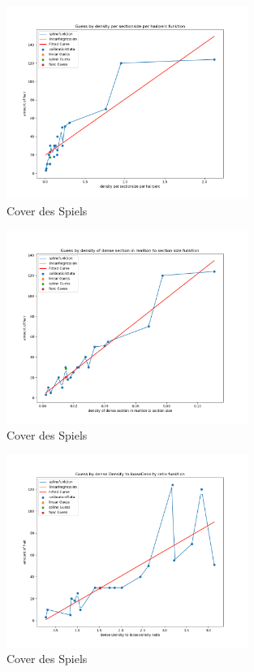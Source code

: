 \documentclass[german,a4paper, 12pt]{scrartcl}
\begin{document}
\begin{figure}
	\centering
	\includegraphics[width=0.7\textwidth]{figBina/g3.png}
	\caption[]{Cover des Spiels}
	\label{img:Bina01}
\end{figure}
\begin{figure}
	\centering
	\includegraphics[width=0.7\textwidth]{figBina/g4.png}
	\caption[]{Cover des Spiels}
	\label{img:Bina01}
\end{figure}
\begin{figure}
	\centering
	\includegraphics[width=0.7\textwidth]{figBina/g5.png}
	\caption[]{Cover des Spiels}
	\label{img:Bina01}
\end{figure}
\end{document}
